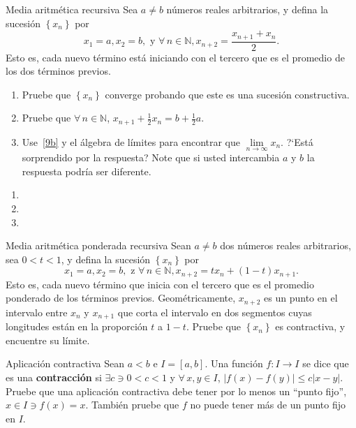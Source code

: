 \begin{prob}{Media aritmética recursiva}
Sea $a\neq b$ números reales arbitrarios, y defina la sucesión $\left\{x_{n}\right\}$ por \[ x_{1}=a,x_{2}=b,\text{ y }\forall\,n\in\mathds{N},x_{n+2}=\frac{x_{n+1}+x_{n}}{2}. \] Esto es, cada nuevo término está iniciando con el tercero que es el promedio de los dos términos previos.
	\begin{enumerate}
		\item Pruebe que $\left\{x_{n}\right\}$ converge probando que este es una sucesión constructiva.
		\item Pruebe que $\forall\,n\in\mathds{N}$, $x_{n+1}+\frac{1}{2}x_{n}=b+\frac{1}{2}a$.\label{9b}
		\item Use~\ref{9b} y el álgebra de límites para encontrar que  $\lim\limits_{n\to\infty}x_{n}$. ?`Está sorprendido por la respuesta? Note que si usted intercambia $a$ y $b$ la respuesta podría ser diferente.
	\end{enumerate}
\end{prob}

\begin{solution}
	\begin{enumerate}
		\item 
		\item 
		\item 
	\end{enumerate}
\end{solution}

\begin{prob}{Media aritmética ponderada recursiva}
	Sean $a\neq b$ dos números reales arbitrarios, sea $0<t<1$, y defina la sucesión $\left\{x_{n}\right\}$ por \[ x_{1}=a,x_{2}=b,\text{ z }\forall\,n\in\mathds{N},x_{n+2}=tx_{n}+\left(1-t\right)x_{n+1}. \] Esto es, cada nuevo término que inicia con el tercero que es el promedio ponderado de los términos previos. Geométricamente, $x_{n+2}$ es un punto en el intervalo entre $x_{n}$ y $x_{n+1}$ que corta el intervalo en dos segmentos cuyas longitudes están en la proporción $t$ a $1-t$. Pruebe que $\left\{x_{n}\right\}$ es contractiva, y encuentre su límite.
\end{prob}

\begin{solution}
	
\end{solution}

\begin{prob}{Aplicación contractiva}
	Sean $a<b$ e $I=\left[a,b\right]$. Una función $f\colon I\rightarrow I$ se dice que es una \textbf{contracción} si $\exists c\ni0<c<1$ y $\forall\,x,y\in I$, $|f\left(x\right)-f\left(y\right)|\leq c|x-y|$. Pruebe que una aplicación contractiva debe tener por lo menos un ``punto fijo'', $x\in I\ni f\left(x\right)=x$. También pruebe que $f$ no puede tener más de un punto fijo en $I$.
\end{prob}

